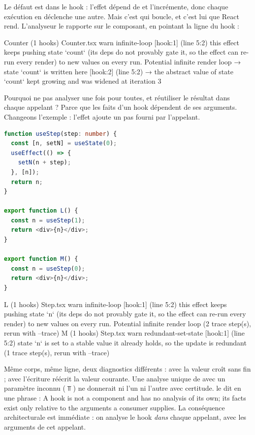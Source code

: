 Le défaut est dans le hook : l'effet dépend de  et l'incrémente, donc chaque exécution en déclenche une autre. Mais c'est  qui boucle, et c'est lui que React rend. L'analyseur le rapporte sur le composant, en pointant la ligne du hook :

\begin{sortie}
  Counter  (1 hooks)  Counter.tsx
    warn   infinite-loop  [hook:1]  (line 5:2)  this effect keeps pushing state `count` (its deps do not provably gate it, so the effect can re-run every render) to new values on every run. Potential infinite render loop
       → state `count` is written here [hook:2] (line 5:2)
       → the abstract value of state `count` kept growing and was widened at iteration 3
\end{sortie}

Pourquoi ne pas analyser  une fois pour toutes, et réutiliser le résultat dans chaque appelant ? Parce que les faits d'un hook dépendent de ses arguments. Changeons l'exemple : l'effet ajoute un pas  fourni par l'appelant.

\begin{lstlisting}[language=TypeScript,caption={Le même corps, deux faits incomparables (\file{/tmp/ch08/step/Step.tsx})},label={lst:splice-usestep}]
function useStep(step: number) {
  const [n, setN] = useState(0);
  useEffect(() => {
    setN(n + step);
  }, [n]);
  return n;
}

export function L() {
  const n = useStep(1);
  return <div>{n}</div>;
}

export function M() {
  const n = useStep(0);
  return <div>{n}</div>;
}
\end{lstlisting}

\begin{sortie}
  L  (1 hooks)  Step.tsx
    warn   infinite-loop  [hook:1]  (line 5:2)  this effect keeps pushing state `n` (its deps do not provably gate it, so the effect can re-run every render) to new values on every run. Potential infinite render loop
       (2 trace step(s), rerun with --trace)
  M  (1 hooks)  Step.tsx
    warn   redundant-set-state  [hook:1]  (line 5:2)  state `n` is set to a stable value it already holds, so the update is redundant
       (1 trace step(s), rerun with --trace)
\end{sortie}

Même corps, même ligne, deux diagnostics différents : avec  la valeur croît sans fin ; avec  l'écriture réécrit la valeur courante. Une analyse unique de  avec un paramètre inconnu ($\Top$) ne donnerait ni l'un ni l'autre avec certitude.  le dit en une phrase : \og A hook is not a component and has no analysis of its own; its facts exist only relative to the arguments a consumer supplies.\fg{} La conséquence architecturale est immédiate : on analyse le hook \emph{dans} chaque appelant, avec les arguments de cet appelant.

